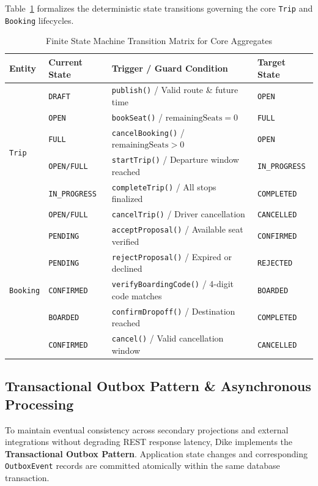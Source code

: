 \documentclass[conference,10pt,a4paper]{IEEEtran}
\begin{document}
Table~\ref{tab:fsm_transitions} formalizes the deterministic state transitions governing the core \texttt{Trip} and \texttt{Booking} lifecycles.

\begin{table}[!ht]
\caption{Finite State Machine Transition Matrix for Core Aggregates}
\label{tab:fsm_transitions}
\centering
\scriptsize
\begin{tabularx}{\columnwidth}{llXl}
\toprule
\textbf{Entity} & \textbf{Current State} & \textbf{Trigger / Guard Condition} & \textbf{Target State} \\
\midrule
\multirow{6}{*}{\texttt{Trip}} 
& \texttt{DRAFT} & \texttt{publish()} / Valid route \& future time & \texttt{OPEN} \\
& \texttt{OPEN} & \texttt{bookSeat()} / $\text{remainingSeats} = 0$ & \texttt{FULL} \\
& \texttt{FULL} & \texttt{cancelBooking()} / $\text{remainingSeats} > 0$ & \texttt{OPEN} \\
& \texttt{OPEN/FULL} & \texttt{startTrip()} / Departure window reached & \texttt{IN\_PROGRESS} \\
& \texttt{IN\_PROGRESS} & \texttt{completeTrip()} / All stops finalized & \texttt{COMPLETED} \\
& \texttt{OPEN/FULL} & \texttt{cancelTrip()} / Driver cancellation & \texttt{CANCELLED} \\
\midrule
\multirow{5}{*}{\texttt{Booking}} 
& \texttt{PENDING} & \texttt{acceptProposal()} / Available seat verified & \texttt{CONFIRMED} \\
& \texttt{PENDING} & \texttt{rejectProposal()} / Expired or declined & \texttt{REJECTED} \\
& \texttt{CONFIRMED} & \texttt{verifyBoardingCode()} / 4-digit code matches & \texttt{BOARDED} \\
& \texttt{BOARDED} & \texttt{confirmDropoff()} / Destination reached & \texttt{COMPLETED} \\
& \texttt{CONFIRMED} & \texttt{cancel()} / Valid cancellation window & \texttt{CANCELLED} \\
\bottomrule
\end{tabularx}
\end{table}

\subsection{Transactional Outbox Pattern \& Asynchronous Processing}
To maintain eventual consistency across secondary projections and external integrations without degrading REST response latency, Dike implements the \textbf{Transactional Outbox Pattern}. Application state changes and corresponding \texttt{OutboxEvent} records are committed atomically within the same database transaction.
\end{document}
